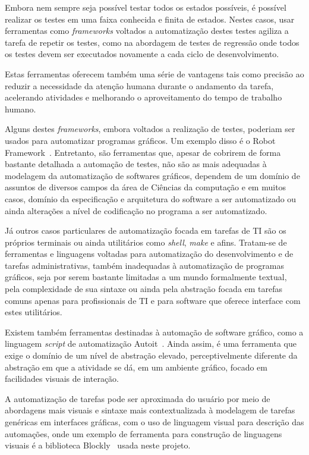 \documentclass[tg]{mdtufsm}
\begin{document}
        Embora nem sempre seja possível testar todos os estados possíveis, é possível realizar os testes em uma faixa conhecida e finita de estados. Nestes casos, usar ferramentas como \emph{frameworks} voltados a automatização destes testes agiliza a tarefa de repetir os testes, como na abordagem de testes de regressão onde todos os testes devem ser executados novamente a cada ciclo de desenvolvimento.

        Estas ferramentas oferecem também uma série de vantagens tais como precisão ao reduzir a necessidade da atenção humana durante o andamento da tarefa, acelerando atividades e melhorando o aproveitamento do tempo de trabalho humano.

        Alguns destes \emph{frameworks}, embora voltados a realização de testes, poderiam ser usados para automatizar programas gráficos. Um exemplo disso é o Robot Framework~\cite{robotFW}. Entretanto, são ferramentas que, apesar de cobrirem de forma bastante detalhada a automação de testes, não são as mais adequadas à modelagem da automatização de softwares gráficos, dependem de um domínio de assuntos de diversos campos da área de Ciências da computação e em muitos casos, domínio da especificação e arquitetura do software a ser automatizado ou ainda alterações a nível de codificação no programa a ser automatizado.

        Já outros casos particulares de automatização focada em tarefas de TI são os próprios terminais ou ainda utilitários como \emph{shell},  \emph{make} e afins. Tratam-se de ferramentas e linguagens voltadas para automatização do desenvolvimento e de tarefas administrativas, também inadequadas à automatização de programas gráficos, seja por serem bastante limitadas a um mundo formalmente textual, pela complexidade de sua sintaxe ou ainda pela abstração focada em tarefas comuns apenas para profissionais de TI e para software que oferece interface com estes utilitários.

        Existem também ferramentas destinadas à automação de software gráfico, como a linguagem \emph{script} de automatização Autoit~\cite{autoit}. Ainda assim, é uma ferramenta que exige o domínio de um nível de abstração elevado, perceptivelmente diferente da abstração em que a atividade se dá, em um ambiente gráfico, focado em facilidades visuais de interação.

        A automatização de tarefas pode ser aproximada do usuário por meio de abordagens mais visuais e sintaxe mais contextualizada à modelagem de tarefas genéricas em interfaces gráficas, com o uso de linguagem visual para descrição das automações, onde um exemplo de ferramenta para construção de linguagens visuais é a biblioteca Blockly~\cite{blocklyResource} usada neste projeto.
\end{document}
